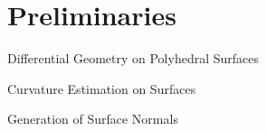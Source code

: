 \documentclass{stdlocal}
\begin{document}
\section{Preliminaries} %
\label{sec:preliminaries}

  Differential Geometry on Polyhedral Surfaces
  \autocite{polthier2006}

  Curvature Estimation on Surfaces
  \autocite{rusinkiewicz2004}

  Generation of Surface Normals
  \autocite{max1999,meyer2001,jin2005}

\end{document}
